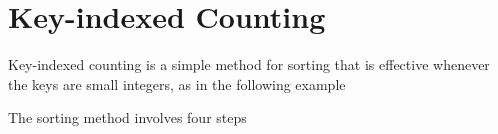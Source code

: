 \documentclass[8pt,a4paper,compress]{beamer}
\begin{document}
\section{Key-indexed Counting}
\begin{frame}[fragile]
\pause

Key-indexed counting is a simple method for sorting that is effective whenever the keys are small integers, as in the following example

\begin{center}
\end{center}

\pause
\bigskip

The sorting method involves four steps
\end{frame}
\end{document}
